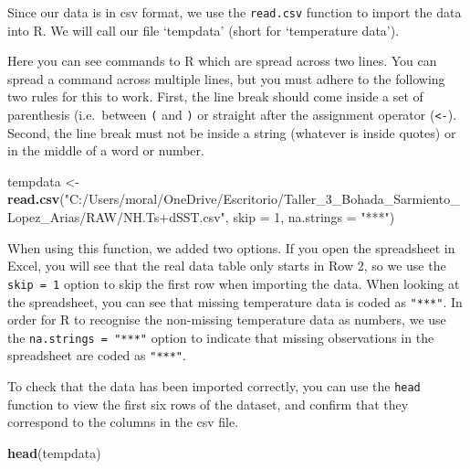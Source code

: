 \documentclass[
]{article}
\newenvironment{Shaded}{\begin{snugshade}}{\end{snugshade}}
\newcommand{\AttributeTok}[1]{\textcolor[rgb]{0.13,0.29,0.53}{#1}}
\newcommand{\DecValTok}[1]{\textcolor[rgb]{0.00,0.00,0.81}{#1}}
\newcommand{\FunctionTok}[1]{\textcolor[rgb]{0.13,0.29,0.53}{\textbf{#1}}}
\newcommand{\NormalTok}[1]{#1}
\newcommand{\OtherTok}[1]{\textcolor[rgb]{0.56,0.35,0.01}{#1}}
\newcommand{\StringTok}[1]{\textcolor[rgb]{0.31,0.60,0.02}{#1}}
\begin{document}
Since our data is in csv format, we use the \texttt{read.csv} function
to import the data into R. We will call our file `tempdata' (short for
`temperature data').

Here you can see commands to R which are spread across two lines. You
can spread a command across multiple lines, but you must adhere to the
following two rules for this to work. First, the line break should come
inside a set of parenthesis (i.e.~between \texttt{(} and \texttt{)} or
straight after the assignment operator (\texttt{\textless{}-}). Second,
the line break must not be inside a string (whatever is inside quotes)
or in the middle of a word or number.

\begin{Shaded}
\begin{Highlighting}[]
\NormalTok{tempdata }\OtherTok{\textless{}{-}} \FunctionTok{read.csv}\NormalTok{(}\StringTok{"C:/Users/moral/OneDrive/Escritorio/Taller\_3\_Bohada\_Sarmiento\_Lopez\_Arias/RAW/NH.Ts+dSST.csv"}\NormalTok{,}
  \AttributeTok{skip =} \DecValTok{1}\NormalTok{, }\AttributeTok{na.strings =} \StringTok{"***"}\NormalTok{) }
\end{Highlighting}
\end{Shaded}

When using this function, we added two options. If you open the
spreadsheet in Excel, you will see that the real data table only starts
in Row 2, so we use the \texttt{skip\ =\ 1} option to skip the first row
when importing the data. When looking at the spreadsheet, you can see
that missing temperature data is coded as \texttt{"***"}. In order for R
to recognise the non-missing temperature data as numbers, we use the
\texttt{na.strings\ =\ "***"} option to indicate that missing
observations in the spreadsheet are coded as \texttt{"***"}.

To check that the data has been imported correctly, you can use the
\texttt{head} function to view the first six rows of the dataset, and
confirm that they correspond to the columns in the csv file.

\begin{Shaded}
\begin{Highlighting}[]
\FunctionTok{head}\NormalTok{(tempdata)}
\end{Highlighting}
\end{Shaded}
\end{document}
